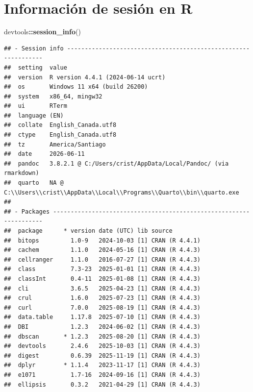 \documentclass[sn-apa,pdflatex]{sn-jnl}
\newenvironment{Shaded}{\begin{snugshade}}{\end{snugshade}}
\newcommand{\FunctionTok}[1]{\textcolor[rgb]{0.13,0.29,0.53}{\textbf{#1}}}
\newcommand{\NormalTok}[1]{#1}
\newcommand{\SpecialCharTok}[1]{\textcolor[rgb]{0.81,0.36,0.00}{\textbf{#1}}}
\begin{document}
\newpage

\section{Información de sesión en
R}\label{informaciuxf3n-de-sesiuxf3n-en-r}

\begin{Shaded}
\begin{Highlighting}[]
\NormalTok{devtools}\SpecialCharTok{::}\FunctionTok{session\_info}\NormalTok{()}
\end{Highlighting}
\end{Shaded}

\begin{verbatim}
## - Session info ---------------------------------------------------------------
##  setting  value
##  version  R version 4.4.1 (2024-06-14 ucrt)
##  os       Windows 11 x64 (build 26200)
##  system   x86_64, mingw32
##  ui       RTerm
##  language (EN)
##  collate  English_Canada.utf8
##  ctype    English_Canada.utf8
##  tz       America/Santiago
##  date     2026-06-11
##  pandoc   3.8.2.1 @ C:/Users/crist/AppData/Local/Pandoc/ (via rmarkdown)
##  quarto   NA @ C:\\Users\\crist\\AppData\\Local\\Programs\\Quarto\\bin\\quarto.exe
## 
## - Packages -------------------------------------------------------------------
##  package      * version date (UTC) lib source
##  bitops         1.0-9   2024-10-03 [1] CRAN (R 4.4.1)
##  cachem         1.1.0   2024-05-16 [1] CRAN (R 4.4.3)
##  cellranger     1.1.0   2016-07-27 [1] CRAN (R 4.4.3)
##  class          7.3-23  2025-01-01 [1] CRAN (R 4.4.3)
##  classInt       0.4-11  2025-01-08 [1] CRAN (R 4.4.3)
##  cli            3.6.5   2025-04-23 [1] CRAN (R 4.4.3)
##  crul           1.6.0   2025-07-23 [1] CRAN (R 4.4.3)
##  curl           7.0.0   2025-08-19 [1] CRAN (R 4.4.3)
##  data.table     1.17.8  2025-07-10 [1] CRAN (R 4.4.3)
##  DBI            1.2.3   2024-06-02 [1] CRAN (R 4.4.3)
##  dbscan       * 1.2.3   2025-08-20 [1] CRAN (R 4.4.3)
##  devtools       2.4.6   2025-10-03 [1] CRAN (R 4.4.3)
##  digest         0.6.39  2025-11-19 [1] CRAN (R 4.4.3)
##  dplyr        * 1.1.4   2023-11-17 [1] CRAN (R 4.4.3)
##  e1071          1.7-16  2024-09-16 [1] CRAN (R 4.4.3)
##  ellipsis       0.3.2   2021-04-29 [1] CRAN (R 4.4.3)

\end{verbatim}
\end{document}
